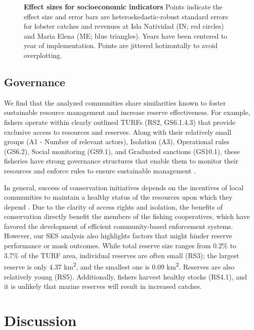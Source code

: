 \documentclass[10pt,letterpaper]{article}
\begin{document}
\begin{figure}[!h]
\centering
\caption{{\bf Effect sizes for socioeconomic indicators}
Points indicate the effect size and error bars are heteroskedastic-robust standard errors for lobster catches and revenues at Isla Natividad (IN; red circles) and Maria Elena (ME; blue triangles). Years have been centered to year of implementation. Points are jittered hotizontally to avoid overplotting.}
\label{fig:lobsters}
\end{figure}

\subsection*{Governance}

We find that the analyzed communities share similarities known to foster sustainable resource management and increase reserve effectiveness. For example, fishers operate within clearly outlined TURFs (RS2, GS6.1.4.3) that provide exclusive access to resources and reserves. Along with their relatively small groups (A1 - Number of relevant actors), Isolation (A3), Operational rules (GS6.2), Social monitoring (GS9.1), and Graduated sanctions (GS10.1), these fisheries have strong governance structures that enable them to monitor their resources and enforce rules to ensure sustainable management \cite{mccay_2014,ayer_2018}.

In general, success of conservation initiatives depends on the incentives of local communities to maintain a healthy status of the resources upon which they depend \cite{jupiter_2017}. Due to the clarity of access rights and isolation, the benefits of conservation directly benefit the members of the fishing cooperatives, which have favored the development of efficient community-based enforcement systems. However, our SES analysis also highlights factors that might hinder reserve performance or mask outcomes. While total reserve size ranges from 0.2\% to 3.7\% of the TURF area, individual reserves are often small (RS3); the largest reserve is only 4.37 km\textsuperscript{2}, and the smallest one is 0.09 km\textsuperscript{2}. Reserves are also relatively young (RS5). Additionally, fishers harvest healthy stocks (RS4.1), and it is unlikely that marine reserves will result in increased catches.

\section*{Discussion}
\end{document}
